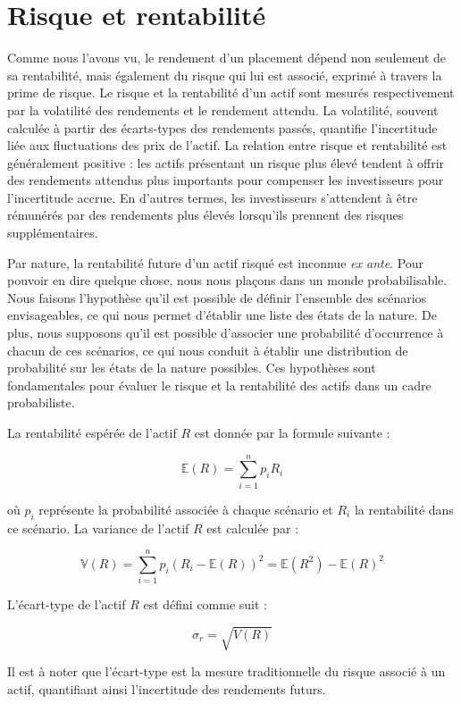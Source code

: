 \documentclass[a4paper, 12pt]{report}
\begin{document}
\section{Risque et rentabilité}

Comme nous l'avons vu, le rendement d'un placement dépend non seulement de sa rentabilité, mais également du risque qui lui est associé, exprimé à travers la prime de risque. Le risque et la rentabilité d'un actif sont mesurés respectivement par la volatilité des rendements et le rendement attendu. La volatilité, souvent calculée à partir des écarts-types des rendements passés, quantifie l'incertitude liée aux fluctuations des prix de l'actif. La relation entre risque et rentabilité est généralement positive : les actifs présentant un risque plus élevé tendent à offrir des rendements attendus plus importants pour compenser les investisseurs pour l'incertitude accrue. En d'autres termes, les investisseurs s'attendent à être rémunérés par des rendements plus élevés lorsqu'ils prennent des risques supplémentaires.

Par nature, la rentabilité future d'un actif risqué est inconnue \textit{ex ante}. Pour pouvoir en dire quelque chose, nous nous plaçons dans un monde probabilisable. Nous faisons l'hypothèse qu'il est possible de définir l'ensemble des scénarios envisageables, ce qui nous permet d'établir une liste des états de la nature. De plus, nous supposons qu'il est possible d'associer une probabilité d'occurrence à chacun de ces scénarios, ce qui nous conduit à établir une distribution de probabilité sur les états de la nature possibles. Ces hypothèses sont fondamentales pour évaluer le risque et la rentabilité des actifs dans un cadre probabiliste.

La rentabilité espérée de l'actif \( R \) est donnée par la formule suivante :

\[
\mathbb{E}(R) = \sum_{i=1}^{n} p_i R_i
\]

où \( p_i \) représente la probabilité associée à chaque scénario et \( R_i \) la rentabilité dans ce scénario. La variance de l’actif \( R \) est calculée par :

\[
\mathbb{V}(R) = \sum_{i=1}^{n} p_i (R_i - \mathbb{E}(R))^2 = \mathbb{E}(R^2) - \mathbb{E}(R)^2
\]

L'écart-type de l'actif \( R \) est défini comme suit :

\[
\sigma_r = \sqrt{V(R)}
\]

Il est à noter que l'écart-type est la mesure traditionnelle du risque associé à un actif, quantifiant ainsi l'incertitude des rendements futurs.
\end{document}
